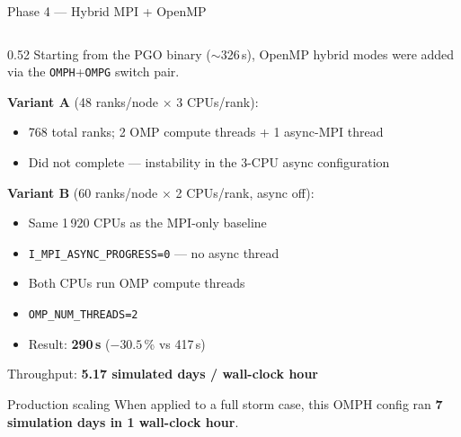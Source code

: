 \documentclass[aspectratio=169,10pt]{beamer}
\begin{document}
\begin{frame}[shrink=18]{Phase 4 --- Hybrid MPI + OpenMP}

  \begin{columns}[T]
    \begin{column}{0.52\textwidth}
      Starting from the PGO binary ($\sim$326\,s), OpenMP hybrid modes
      were added via the \texttt{OMPH}+\texttt{OMPG} switch pair.

      \vspace{0.5em}
      \textbf{Variant A} (48 ranks/node $\times$ 3 CPUs/rank):
      \begin{itemize}
        \item 768 total ranks; 2 OMP compute threads + 1 async-MPI thread
        \item \textcolor{w3red}{Did not complete} --- instability in the
              3-CPU async configuration
      \end{itemize}

      \vspace{0.4em}
      \textbf{Variant B} (60 ranks/node $\times$ 2 CPUs/rank, async off):
      \begin{itemize}
        \item Same 1\,920 CPUs as the MPI-only baseline
        \item \texttt{I\_MPI\_ASYNC\_PROGRESS=0} --- no async thread
        \item Both CPUs run OMP compute threads
        \item \texttt{OMP\_NUM\_THREADS=2}
        \item \alert{Result: \textbf{290\,s} ($-30.5$\,\% vs 417\,s)}
      \end{itemize}

      \vspace{0.3em}
      Throughput: \textbf{5.17 simulated days / wall-clock hour}

      \vspace{0.3em}
      \begin{exampleblock}{Production scaling}
        \small
        When applied to a full storm case, this OMPH config
        ran \textbf{7 simulation days in 1 wall-clock hour}.
      \end{exampleblock}
    \end{column}


\end{columns}
\end{frame}
\end{document}
